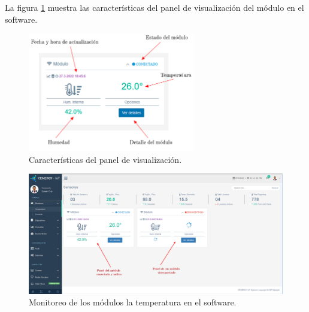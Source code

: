 La figura \ref{fig:test-panel} muestra las características del panel de visualización del módulo en el software.

\begin{figure}[htpb]
\centering 
\includegraphics[width=0.65\textwidth]{./Figures/test/temp/panel.png}
\caption{Características del panel de visualización.}
\label{fig:test-panel}
\end{figure}


\begin{landscape} %
\begin{figure}[htpb]
\centering 
\includegraphics[width=1.7\textwidth]{./Figures/test/temp/lectura.png}
\caption{Monitoreo de los módulos la temperatura en el software.}
\label{fig:temp-lectura}
\end{figure}
\end{landscape} %



